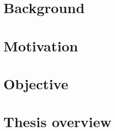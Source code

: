 \section{Background}\label{sec:background}

\section{Motivation}\label{sec:motivation}

\section{Objective}\label{sec:objective}

\section{Thesis overview}\label{sec:overview}
